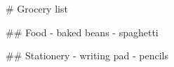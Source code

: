 \documentclass{article}
\begin{document}
    \begin{markdown}
        # Grocery list

        ## Food
        - baked beans
        - spaghetti

        ## Stationery
        - writing pad
        - pencils
    \end{markdown}
\end{document}
